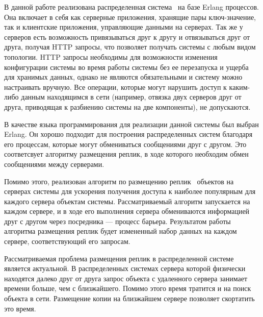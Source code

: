 





\newpage

\tableofcontents
\newpage

\Intro
	В данной работе реализована распределенная система~\cite{distributed} на базе Erlang процессов. Она включает в себя как серверные приложения, хранящие пары ключ-значение, так и клиентские приложения,
	управляющие данными на серверах. Так же у серверов есть возможность привязываться друг к другу и отвязываться друг от друга, получая HTTP запросы, что позволяет получать системы с 
	любым видом топологии. HTTP запросы необходимы для возможности изменения конфигурации системы во время работы системы без ее перезапуска и ущерба для хранимых данных, однако не являются 
	обязательными и систему можно настраивать вручную. Все операции, которые могут нарушить доступ к каким-либо данным находящимся в сети (например, отвязка двух серверов друг от друга, 
	приводящая к разбиению системы на две компоненты), не допускаются.

	В качестве языка программирования для реализации данной системы был выбран Erlang. Он хорошо подходит для построения распределенных систем благодаря его процессам, которые могут обмениваться 
	сообщениями друг с другом. Это соответсвует алгоритму размещения реплик, в ходе которого необходим обмен сообщениями между серверами.
	
	Помимо этого, реализован алгоритм по размещению реплик~\cite{rep} объектов на серверах системы для ускорения получения доступа к наиболее популярным для каждого сервера объектам системы. 
	Рассматриваемый алгоритм запускается на каждом сервере, и в ходе его выполнения сервера обмениваются информацией друг с другом через посредника --- процесс барьера. Результатом работы 
	алгоритма размещения реплик будет измененный набор данных на каждом сервере, соответствующий его запросам.

	Рассматриваемая проблема размещения реплик в распределенной системе является актуальной. В распределенных системах сервера которой физически находятся далеко друг от друга запрос объекта 
	с удаленного сервера занимает времени больше, чем с близжайшего. Помимо этого время тратится и на поиск объекта в сети. Размещение копии на близжайшем сервере позволяет скортатить это время. 
	
